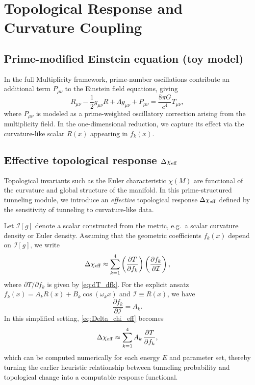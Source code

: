 \documentclass[11pt]{article}
\begin{document}
\section{Topological Response and Curvature Coupling}

\subsection{Prime-modified Einstein equation (toy model)}

In the full Multiplicity framework, prime-number oscillations contribute
an additional term \(P_{\mu\nu}\) to the Einstein field equations, giving
\begin{equation}
  R_{\mu\nu} - \frac{1}{2}g_{\mu\nu}R + \Lambda g_{\mu\nu}
  + P_{\mu\nu}
  = \frac{8\pi G}{c^4} T_{\mu\nu},
  \label{eq:einstein_prime}
\end{equation}
where \(P_{\mu\nu}\) is modeled as a prime-weighted oscillatory
correction arising from the multiplicity field.\cite{tunneling_topology_draft}
In the one-dimensional reduction, we capture its effect via the
curvature-like scalar \(R(x)\) appearing in \(f_k(x)\).

\subsection{Effective topological response \(\Delta\chi_{\rm eff}\)}

Topological invariants such as the Euler characteristic \(\chi(M)\) are
functional of the curvature and global structure of the manifold. In
this prime-structured tunneling module, we introduce an \emph{effective}
topological response \(\Delta\chi_{\rm eff}\) defined by the sensitivity
of tunneling to curvature-like data.\cite{tunneling_topology_draft}

Let \(\mathcal{I}[g]\) denote a scalar constructed from the metric,
e.g.\ a scalar curvature density or Euler density. Assuming that the
geometric coefficients \(f_k(x)\) depend on \(\mathcal{I}[g]\),
we write
\begin{equation}
  \Delta \chi_{\rm eff}
  \approx \sum_{k=1}^{4}
  \left(
    \frac{\partial T}{\partial f_k}
  \right)
  \left(
    \frac{\partial f_k}{\partial \mathcal{I}}
  \right),
  \label{eq:Delta_chi_eff}
\end{equation}
where \(\partial T/\partial f_k\) is given by \eqref{eq:dT_dfk}. For the
explicit ansatz \(f_k(x)=A_k R(x) + B_k \cos(\omega_k x)\) and
\(\mathcal{I} \equiv R(x)\), we have
\begin{equation}
  \frac{\partial f_k}{\partial \mathcal{I}} = A_k.
\end{equation}
In this simplified setting, \eqref{eq:Delta_chi_eff} becomes
\begin{equation}
  \Delta \chi_{\rm eff}
  \approx \sum_{k=1}^{4}
  A_k\,
  \frac{\partial T}{\partial f_k},
\end{equation}
which can be computed numerically for each energy \(E\) and parameter
set, thereby turning the earlier heuristic relationship between
tunneling probability and topological change into a computable response
functional.
\end{document}

